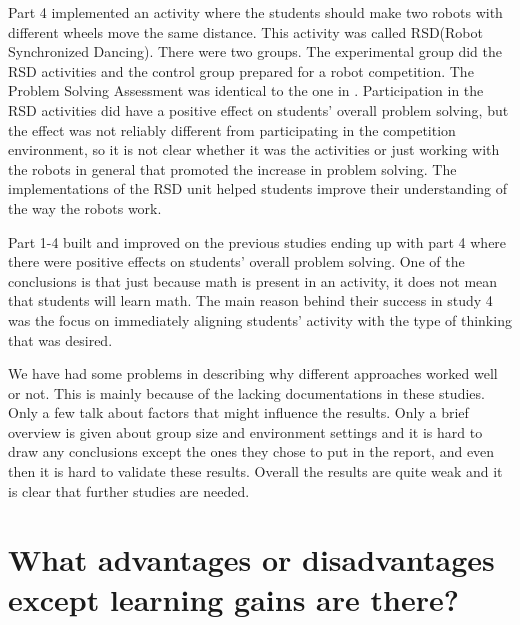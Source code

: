 \bigskip\noindent
Part 4 implemented an activity where the students should make two robots with different wheels move the same distance. This activity was called RSD(Robot Synchronized Dancing). There were two groups. The experimental group did the RSD activities and the control group prepared for a robot competition. The Problem Solving Assessment was identical to the one in . Participation in the RSD activities did have a positive effect on students' overall problem solving, but the effect was not reliably different from participating in the competition environment, so it is not clear whether it was the activities or just working with the robots in general that promoted the increase in problem solving. The implementations of the RSD unit helped students improve their understanding of the way the robots work. 

\bigskip\noindent
Part 1-4 built and improved on the previous studies ending up with part 4 where there were positive effects on students' overall problem solving. One of the conclusions is that just because math is present in an activity, it does not mean that students will learn math. The main reason behind their success in study 4 was the focus on immediately aligning students' activity with the type of thinking that was desired.

\bigskip\noindent
We have had some problems in describing why different approaches worked well or not. This is mainly because of the lacking documentations in these studies. Only a few talk about factors that might influence the results. Only a brief overview is given about group size and environment settings and it is hard to draw any conclusions except the ones they chose to put in the report, and even then it is hard to validate these results. Overall the results are quite weak and it is clear that further studies are needed.

\section{What advantages or disadvantages except learning gains are there?}\label{sec:whatAdvantage}

